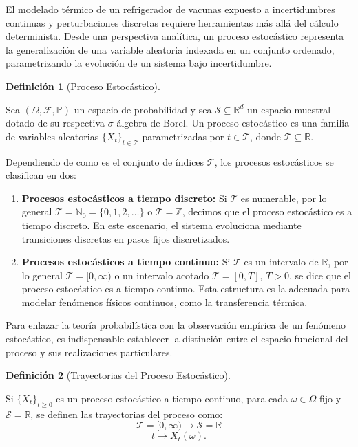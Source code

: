 \documentclass[
  spanish,
  letterpaper,
  DIV=11,
  numbers=noendperiod]{scrreprt}
\providecommand{\tightlist}{%
  \setlength{\itemsep}{0pt}\setlength{\parskip}{0pt}}
\theoremstyle{plain}
\theoremstyle{definition}
\newtheorem{definition}{Definición}[chapter]
\theoremstyle{remark}
\begin{document}
El modelado térmico de un refrigerador de vacunas expuesto a
incertidumbres continuas y perturbaciones discretas requiere
herramientas más allá del cálculo determinista. Desde una perspectiva
analítica, un proceso estocástico representa la generalización de una
variable aleatoria indexada en un conjunto ordenado, parametrizando la
evolución de un sistema bajo incertidumbre.

\begin{definition}[Proceso
Estocástico]\protect\hypertarget{def-proceso-estocastico}{}\label{def-proceso-estocastico}

Sea \((\Omega, \mathcal{F}, \mathbb{P})\) un espacio de probabilidad y
sea \(\mathcal{S} \subseteq \mathbb{R}^d\) un espacio muestral dotado de
su respectiva \(\sigma\)-álgebra de Borel. Un proceso estocástico es una
familia de variables aleatorias \(\{X_t\}_{t \in \mathcal{T}}\)
parametrizadas por \(t \in \mathcal{T}\), donde
\(\mathcal{T} \subseteq \mathbb{R}\).

\end{definition}

Dependiendo de como es el conjunto de índices \(\mathcal{T}\), los
procesos estocásticos se clasifican en dos:

\begin{enumerate}
\def\labelenumi{\arabic{enumi}.}
\tightlist
\item
  \textbf{Procesos estocásticos a tiempo discreto:} Si \(\mathcal{T}\)
  es numerable, por lo general
  \(\mathcal{T} = \mathbb{N}_0 = \{0, 1, 2, \dots\}\) o
  \(\mathcal{T} = \mathbb{Z}\), decimos que el proceso estocástico es a
  tiempo discreto. En este escenario, el sistema evoluciona mediante
  transiciones discretas en pasos fijos discretizados.
\item
  \textbf{Procesos estocásticos a tiempo continuo:} Si \(\mathcal{T}\)
  es un intervalo de \(\mathbb{R}\), por lo general
  \(\mathcal{T} = [0, \infty)\) o un intervalo acotado
  \(\mathcal{T} = [0, T]\), \(T > 0\), se dice que el proceso
  estocástico es a tiempo continuo. Esta estructura es la adecuada para
  modelar fenómenos físicos continuos, como la transferencia térmica.
\end{enumerate}

Para enlazar la teoría probabilística con la observación empírica de un
fenómeno estocástico, es indispensable establecer la distinción entre el
espacio funcional del proceso y sus realizaciones particulares.

\begin{definition}[Trayectorias del Proceso
Estocástico]\protect\hypertarget{def-trayectoria}{}\label{def-trayectoria}

Si \(\{X_t\}_{t \geq 0}\) es un proceso estocástico a tiempo continuo,
para cada \(\omega \in \Omega\) fijo y \(\mathcal{S} = \mathbb{R}\), se
definen las trayectorias del proceso como: \[
    \mathcal{T} = [0, \infty) \rightarrow \mathcal{S} = \mathbb{R}
\] \[
    t \rightarrow X_t(\omega).
\]

\end{definition}
\end{document}
